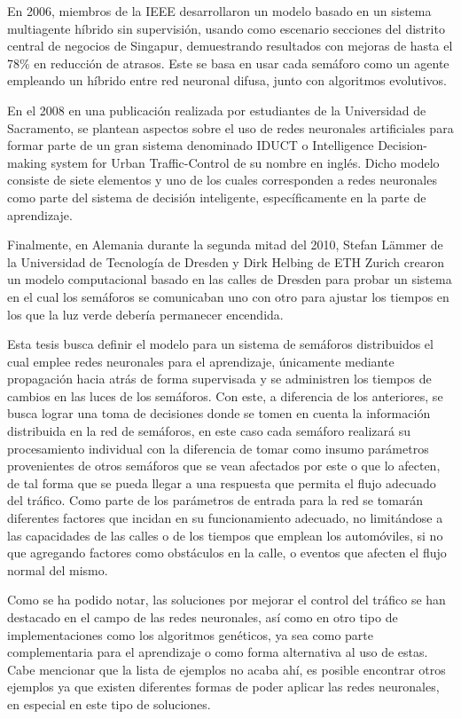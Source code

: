 		En 2006, miembros de la IEEE desarrollaron un modelo basado en un sistema
	multiagente h\'{i}brido sin supervisi\'{o}n, usando como escenario secciones del
	distrito central de negocios de Singapur, demuestrando resultados con mejoras
	de hasta el 78\% en reducci\'{o}n de atrasos. Este se basa en usar cada sem\'{a}foro como
	un agente empleando un h\'{i}brido entre red neuronal difusa, junto con algoritmos
	evolutivos. \cite{Srinivasan2006}
	
		En el 2008 en una publicaci\'{o}n realizada por estudiantes de la Universidad de
	Sacramento, se plantean aspectos sobre el uso de redes neuronales
	artificiales para formar parte de un gran sistema denominado IDUCT o
	Intelligence Decision-making system for Urban Traffic-Control de su nombre en
	ingl\'{e}s. Dicho modelo consiste de siete elementos y uno de los cuales
	corresponden a redes neuronales como parte del sistema de decisi\'{o}n
	inteligente, espec\'{i}ficamente en la parte de aprendizaje.
	\cite{Krishnani2008}

		Finalmente, en Alemania durante la segunda mitad del 2010, Stefan L\"{a}mmer
	de la Universidad de Tecnolog\'{i}a de Dresden y Dirk Helbing de ETH Zurich crearon un
	modelo computacional basado en las calles de Dresden para probar un sistema en
	el cual los sem\'{a}foros se comunicaban uno con otro para ajustar los tiempos
	en los que la luz verde deber\'{i}a permanecer encendida.\cite{Ben2010}
	
		Esta tesis busca definir el modelo para un sistema de sem\'{a}foros distribuidos
	el cual emplee redes neuronales para el aprendizaje, \'{u}nicamente mediante
	propagaci\'{o}n hacia atr\'{a}s de forma supervisada y se administren los tiempos de
	cambios en las luces de los sem\'{a}foros. Con este, a diferencia de los
	anteriores, se busca lograr una toma de decisiones donde se tomen en cuenta la informaci\'{o}n distribuida en la red de sem\'{a}foros, en este caso cada sem\'{a}foro realizar\'{a} su procesamiento individual con la diferencia de tomar como insumo par\'{a}metros provenientes de otros sem\'{a}foros que se vean afectados por este o que lo afecten, de tal forma que se pueda llegar a una respuesta que permita el flujo adecuado del tr\'{a}fico. Como parte de los par\'{a}metros de entrada para la red se tomar\'{a}n diferentes factores que incidan en su funcionamiento adecuado, no limit\'{a}ndose a las capacidades de las calles o de los tiempos que emplean los autom\'{o}viles, si no que agregando factores como obst\'{a}culos en la calle, o eventos que afecten el flujo normal del mismo.
	
		Como se ha podido notar, las soluciones por mejorar el control del tr\'{a}fico se
	han destacado en el campo de las redes neuronales, as\'{i} como en otro tipo
	de implementaciones como los algoritmos gen\'{e}ticos, ya sea como parte
	complementaria para el aprendizaje o como forma alternativa al uso de estas.
	\cite{Ayad} Cabe mencionar que la lista de ejemplos no acaba ah\'{i}, es
	posible encontrar otros ejemplos ya que existen diferentes formas de poder aplicar las redes neuronales, en especial en este tipo de soluciones.
